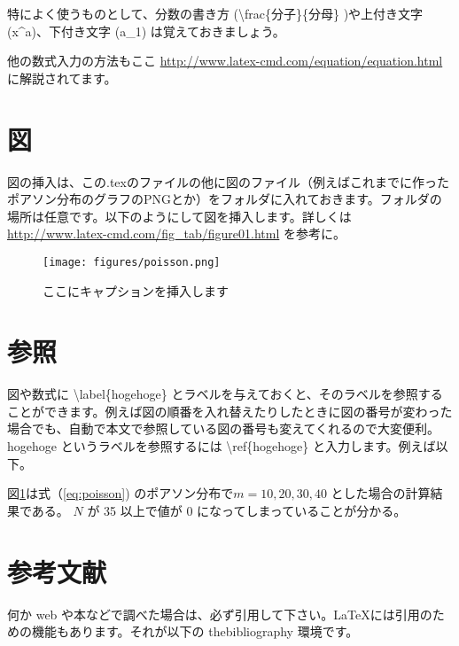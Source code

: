 \documentclass{jsarticle}
\begin{document}
特によく使うものとして、分数の書き方 (\textbackslash frac\{分子\}\{分母\} )や上付き文字 (x\textasciicircum a)、下付き文字 (a\_1) は覚えておきましょう。

他の数式入力の方法もここ \url{http://www.latex-cmd.com/equation/equation.html} に解説されてます。



\section{図}
図の挿入は、この.texのファイルの他に図のファイル（例えばこれまでに作ったポアソン分布のグラフのPNGとか）をフォルダに入れておきます。フォルダの場所は任意です。以下のようにして図を挿入します。詳しくは \url{http://www.latex-cmd.com/fig_tab/figure01.html} を参考に。

\begin{figure} %
\centering %
\texttt{[image: figures/poisson.png]}  %
\caption{ここにキャプションを挿入します} %
\label{fig:poisson} %
\end{figure}


\section{参照}

図や数式に \textbackslash label\{hogehoge\} とラベルを与えておくと、そのラベルを参照することができます。例えば図の順番を入れ替えたりしたときに図の番号が変わった場合でも、自動で本文で参照している図の番号も変えてくれるので大変便利。hogehoge というラベルを参照するには \textbackslash ref\{hogehoge\} と入力します。例えば以下。

図\ref{fig:poisson}は式（\ref{eq:poisson}) のポアソン分布で$m=10, 20, 30, 40$ とした場合の計算結果である。 $N$ が 35 以上で値が 0 になってしまっていることが分かる。


\section{参考文献}

何か web や本などで調べた場合は、必ず引用して下さい。\LaTeX には引用のための機能もあります。それが以下の thebibliography 環境です。
\end{document}
